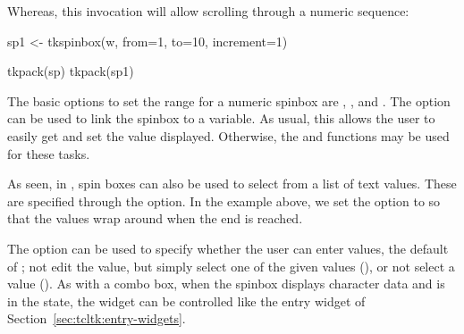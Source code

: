 Whereas, this invocation will allow scrolling through a numeric sequence:
\begin{Schunk}
\begin{Sinput}
 sp1 <- tkspinbox(w, from=1, to=10, increment=1)
\end{Sinput}
\end{Schunk}

\begin{Schunk}
\begin{Sinput}
 tkpack(sp)
 tkpack(sp1)
\end{Sinput}
\end{Schunk}


The basic options to set the range for a numeric spinbox are
, , and
.  The 
option can be used to link the spinbox to a \TCL\/ variable. As usual,
this allows the user to easily get and set the value
displayed. Otherwise, the  and 
functions may be used for these tasks. 

As seen, in \TK, spin boxes can also be used to select from a list of
text values. These are specified through the
 option. In the  example
above, we set the  option to  so
that the values wrap around when the end is reached.
 
The option  can be used to specify whether
the user can enter values, the default of ; not edit the
value, but simply select one of the given values (),
or not select a value ().  As with a combo box, when
the \TK\/ spinbox displays character data and is in the 
state, the widget can be controlled like the entry widget of
Section~\ref{sec:tcltk:entry-widgets}.




